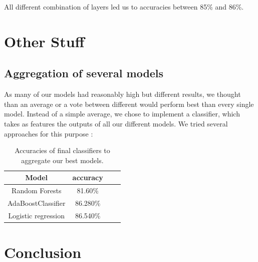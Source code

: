 \documentclass[10pt,conference,compsocconf,retainorgcmds]{IEEEtran}
\begin{document}
All different combination of layers led us to accuracies between 85\% and 86\%.
\section{Other Stuff}
\subsection{Aggregation of several models}

As many of our models had reasonably high but different results, we thought than an average or a vote between different would perform best than every single model. Instead of a simple average, we chose to implement a classifier, which takes as features the outputs of all our different models. We tried several approaches for this purpose : 
\begin{table}[h]
\begin{center}
\begin{tabular}{|c|c|c|c|}
\hline
Model & accuracy \\
\hline
Random Forests & 81.60\% \\
\hline
AdaBoostClassifier & 86.280\% \\
\hline
Logistic regression & 86.540\% \\
\hline

\end{tabular}
\label{classifier}
\caption{Accuracies of final classifiers to aggregate our best models.}
\end{center}
\end{table}


\section{Conclusion}
\end{document}

